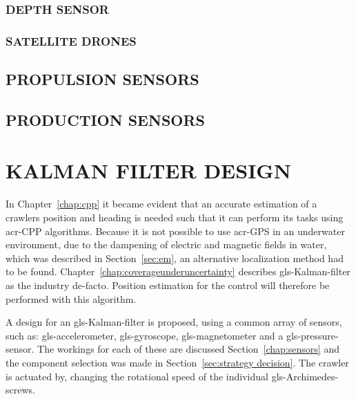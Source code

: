 \subsubsection{DEPTH SENSOR}\label{sec:depth sensor}

\subsubsection{SATELLITE DRONES}\label{sec:satalite drones}


\subsection{PROPULSION SENSORS}\label{sec:propulsion sensors}

\subsection{PRODUCTION SENSORS}

\section{KALMAN FILTER DESIGN}

In Chapter~\ref{chap:cpp} it became evident that an accurate estimation of a crawlers position and heading is needed
such that it can perform its tasks using \gls{acr-CPP} algorithms. Because it is not possible to use \gls{acr-GPS} in an
underwater environment, due to the dampening of electric and magnetic fields in water, which was described in
Section~\ref{sec:em}, an alternative localization method had to be found. Chapter~\ref{chap:coverageunderuncertainty}
describes \gls{gls-Kalman-filter} as the industry de-facto. Position estimation for the control will therefore be
performed with this algorithm.

A design for an \gls{gls-Kalman-filter} is proposed, using a common array of sensors, such as: \gls{gls-accelerometer},
\gls{gls-gyroscope}, \gls{gls-magnetometer} and a \gls{gls-pressure-sensor}. The workings for each of these are
discussed Section~\ref{chap:sensors} and the component selection was made in Section~\ref{sec:strategy decision}. The
crawler is actuated by, changing the rotational speed of the individual \gls{gls-Archimedes-screw}s.

